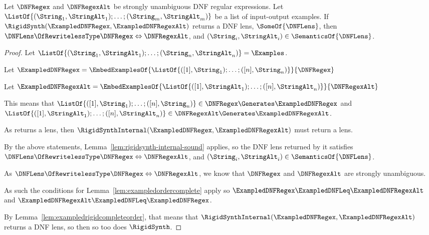 \documentclass[sigplan,acmsmall]{acmart}
\begin{document}
\begin{lemma}
  \label{lem:rigidsynth-sound}
  Let $\DNFRegex$ and $\DNFRegexAlt$ be strongly unambiguous DNF regular
  expressions.
  Let\\ $\ListOf{(\String_1,\StringAlt_1);\ldots;(\String_m,\StringAlt_m)}$ be a
  list of input-output examples.
  If $\RigidSynth(\ExampledDNFRegex,\ExampledDNFRegexAlt)$ returns
  a DNF lens, $\SomeOf{\DNFLens}$, then  $\DNFLens \OfRewritelessType \DNFRegex 
  \Leftrightarrow \DNFRegexAlt$, and $(\String_i,\StringAlt_i) \in
  \SemanticsOf{\DNFLens}$. 
\end{lemma}
\begin{proof}
  Let $\ListOf{(\String_1,\StringAlt_1);\ldots;(\String_n,\StringAlt_n)} =
  \Examples$.
  
  Let $\ExampledDNFRegex =
  \EmbedExamplesOf{\ListOf{([1],\String_1);\ldots;([n],\String_n)}}{\DNFRegex}$

  Let $\ExampledDNFRegexAlt = \EmbedExamplesOf{\ListOf{([1],\StringAlt_1);\ldots;([n],\StringAlt_n)}}{\DNFRegexAlt}$

  This means that $\ListOf{([1],\String_1);\ldots;([n],\String_n)} \in \DNFRegex
  \Generates \ExampledDNFRegex$ and
  $\ListOf{([1],\StringAlt_1);\ldots;([n],\StringAlt_n)} \in \DNFRegexAlt
  \Generates \ExampledDNFRegexAlt$.

  As \RigidSynth{} returns a lens, then
  $\RigidSynthInternal(\ExampledDNFRegex,\ExampledDNFRegexAlt)$ must return a
  lens.

  By the above statements, Lemma~\ref{lem:rigidsynth-internal-sound} applies, so
  the DNF lens returned by it satisfies $\DNFLens \OfRewritelessType \DNFRegex
  \Leftrightarrow \DNFRegexAlt$, and
  $(\String_i,\StringAlt_i)\in\SemanticsOf{\DNFLens}$.

  As $\DNFLens \OfRewritelessType \DNFRegex \Leftrightarrow \DNFRegexAlt$, we
  know that $\DNFRegex$ and $\DNFRegexAlt$ are strongly unambiguous.

  As such the conditions for Lemma~\ref{lem:exampledordercomplete} apply so
  $\ExampledDNFRegex \ExampledDNFLeq \ExampledDNFRegexAlt$ and
  $\ExampledDNFRegexAlt \ExampledDNFLeq \ExampledDNFRegex$.

  By Lemma~\ref{lem:exampledrigidcompleteorder}, that means that
  $\RigidSynthInternal(\ExampledDNFRegex,\ExampledDNFRegexAlt)$ returns a DNF
  lens, so then so too does $\RigidSynth$.




\end{proof}
\end{document}
